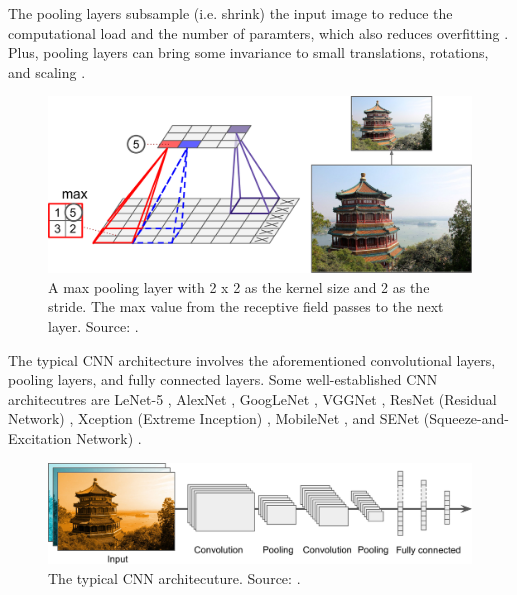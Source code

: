 \documentclass[a4paper, 11pt, oneside]{article}
\begin{document}
  The pooling layers subsample (i.e. shrink) the input image to reduce the computational load and the number of paramters,
  which also reduces overfitting \cite{geron2019hands}. Plus, pooling layers can bring some invariance to small
  translations, rotations, and scaling \cite{geron2019hands}.

  \begin{figure}[ht]
    \begin{center}
      \includegraphics[width=.5\textwidth]{max_pooling.png}
    \end{center}
    \caption{A max pooling layer with 2 x 2 as the kernel size and 2 as the stride. The max value from the receptive
    field passes to the next layer. Source: \cite{geron2019hands}.}
  \end{figure}

  The typical CNN architecture involves the aforementioned convolutional layers, pooling layers, and fully connected layers.
  Some well-established CNN architecutres are LeNet-5 \cite{lecun1998gradient}, AlexNet \cite{krizhevsky2012imagenet},
  GoogLeNet \cite{szegedy2015going}, VGGNet \cite{simonyan2014very}, ResNet (Residual Network) \cite{he2016deep}, Xception
  (Extreme Inception) \cite{chollet2017xception}, MobileNet \cite{howard2017mobilenets, sandler2018mobilenetv2},
  and SENet (Squeeze-and-Excitation Network) \cite{hu2018squeeze}.

  \begin{figure}[ht]
    \begin{center}
      \includegraphics[width=.8\textwidth]{typical_cnn.png}
    \end{center}
    \caption{The typical CNN architecuture. Source: \cite{geron2019hands}.}
  \end{figure}
\end{document}

